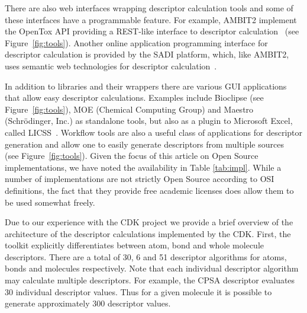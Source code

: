 \documentclass[letterpaper, 12pt]{article}
\begin{document}
There are also web interfaces wrapping descriptor calculation tools
and some of these interfaces have a programmable feature. For example,
AMBIT2 implement the OpenTox API providing a REST-like interface
to descriptor calculation~\cite{Jeliazkova2011,Hardy2010} (see Figure~\ref{fig:tools}). Another
online application programming interface for descriptor calculation
is provided by the SADI platform, which, like AMBIT2, uses semantic
web technologies for descriptor calculation~\cite{Chepelev2011b}.

In addition to libraries and their wrappers there are various GUI
applications that allow easy descriptor calculations. Examples include
Bioclipse \cite{Spjuth:2007aa} (see Figure~\ref{fig:tools}), MOE (Chemical Computing Group) and
Maestro (Schr\"{o}dinger, Inc.) as standalone tools, but also
as a plugin to Microsoft Excel, called LICSS~\cite{Lawson2011}.
Workflow tools are also a useful
class of applications for descriptor generation and allow one to
easily generate descriptors from multiple sources~\cite{Truszkowski2011}
(see Figure~\ref{fig:tools}). Given the focus of
this article on Open Source implementations, we have noted the
availability in Table \ref{tab:impl}. While a number of
implementations are not strictly Open Source according to OSI
definitions, the fact that they provide free academic licenses does
allow them to be used somewhat freely.

Due to our experience with the CDK project we provide a brief overview
of the architecture of the descriptor calculations implemented by the
CDK. First, the toolkit explicitly differentiates between atom, bond
and whole molecule descriptors. There are a total of 30, 6 and 51
descriptor algorithms for atoms, bonds and molecules respectively. Note that
each individual descriptor algorithm may calculate multiple descriptors. For example,
the CPSA descriptor evaluates 30 individual descriptor values. Thus for a given
molecule it is possible to generate approximately 300 descriptor
values.
\end{document}
